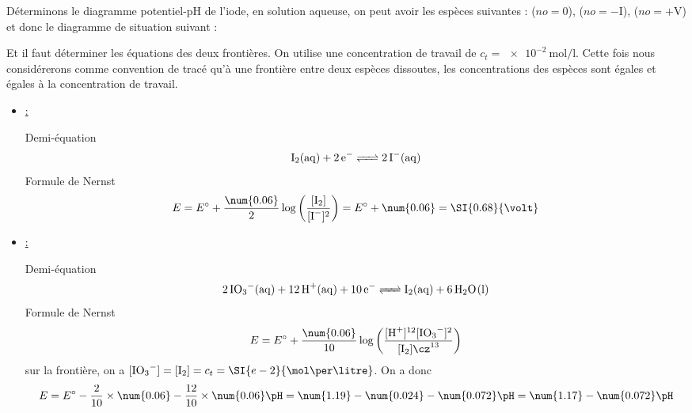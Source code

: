 \documentclass{cours}
\begin{document}
Déterminons le diagramme potentiel-pH de l'iode, en solution aqueuse, on peut avoir les espèces suivantes : ($no=0$), ($no = -\text{I}$), ($no=+\text{V}$) et donc le diagramme de situation suivant :
\begin{center}
\end{center}
Et il faut déterminer les équations des deux frontières. On utilise une concentration de travail de $c_t=\SI{e-2}{\mol\per\litre}$. Cette fois nous considérerons comme convention de tracé qu'à une frontière entre deux espèces dissoutes, les concentrations des espèces sont égales et égales à la concentration de travail. 
\begin{itemize}
  \item \underline{ : }

  Demi-équation
  \begin{equation}
    \ce{I2(aq) + 2e- <=> 2I-(aq) }
  \end{equation}
  Formule de Nernst
  \begin{equation}
    E = E^\circ + \frac{\num{0.06}}{2} \log \left( \frac{[\ce{I2}]}{[\ce{I-}]^2} \right) = E^\circ + \num{0.06} = \SI{0.68}{\volt}
  \end{equation}

  \item \underline{ :}

  Demi-équation
   \begin{equation}
     \ce{2IO3-(aq) +12H+(aq) + 10e- <=> I2(aq) + 6H2O(l)}
   \end{equation}
  Formule de Nernst
  \begin{equation}
    E = E^\circ + \frac{\num{0.06}}{10} \log \left( \frac{[\ce{H+}]^{12}[\ce{IO3-}]^2}{[\ce{I2}]\cz^{13}} \right) 
  \end{equation}
  sur la frontière, on a $[\ce{IO3-}] = [\ce{I2}] = c_t = \SI{e-2}{\mol\per\litre}$. On a donc 
  \begin{equation}
    E = E^\circ - \frac{2}{10}\times\num{0.06} - \frac{12}{10}\times\num{0.06}\pH = \num{1.19} - \num{0.024} - \num{0.072} \pH = \num{1.17}-\num{0.072}\pH
  \end{equation}
\end{itemize}
\end{document}
